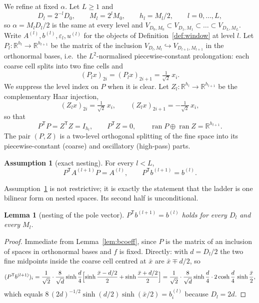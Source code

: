 \documentclass[11pt,a4paper]{article}
\theoremstyle{plain}
\newtheorem{lemma}[theorem]{Lemma}
\theoremstyle{definition}
\newtheorem{assumption}[theorem]{Assumption}
\newcommand{\R}{\mathbb{R}}
\newcommand{\T}{\mathsf{T}}
\newcommand{\ran}{\operatorname{ran}}
\begin{document}
We refine at fixed $\alpha$. Let $L\ge1$ and
\begin{equation}
\label{eq:levels}
  D_{l}=2^{-l}D_{0},\qquad M_{l}=2^{l}M_{0},\qquad h_{l}=M_{l}/2,
  \qquad l=0,\dots,L,
\end{equation}
so $\alpha=M_{l}D_{l}/2$ is the same at every level and
$V_{D_{0},M_{0}}\subset V_{D_{1},M_{1}}\subset\dots\subset V_{D_{L},M_{L}}$. Write
$A^{(l)},b^{(l)},\varepsilon_{l},u^{(l)}$ for the objects of
Definition~\ref{def:window} at level $l$. Let $P_{l}:\R^{h_{l}}\to\R^{h_{l+1}}$ be
the matrix of the inclusion $V_{D_{l},M_{l}}\hookrightarrow V_{D_{l+1},M_{l+1}}$ in
the orthonormal bases, i.e.\ the $L^{2}$-normalised piecewise-constant prolongation:
each coarse cell splits into two fine cells and
\begin{equation}
\label{eq:P}
  (P_{l}x)_{2i}=(P_{l}x)_{2i+1}=\tfrac{1}{\sqrt2}\,x_{i}.
\end{equation}
We suppress the level index on $P$ when it is clear. Let
$Z_{l}:\R^{h_{l}}\to\R^{h_{l+1}}$ be the complementary Haar injection,
\begin{equation}
\label{eq:Z}
  (Z_{l}x)_{2i}=\tfrac{1}{\sqrt2}\,x_{i},\qquad
  (Z_{l}x)_{2i+1}=-\tfrac{1}{\sqrt2}\,x_{i},
\end{equation}
so that
\begin{equation}
\label{eq:isometries}
  P^{\T}P=Z^{\T}Z=I_{h_{l}},\qquad P^{\T}Z=0,\qquad
  \ran P\oplus\ran Z=\R^{h_{l+1}} .
\end{equation}
The pair $(P,Z)$ is a two-level orthogonal splitting of the fine space into its
piecewise-constant (coarse) and oscillatory (high-pass) parts.

\begin{assumption}[exact nesting]
\label{ass:nesting}
For every $l<L$,
\begin{equation}
\label{eq:nesting}
  P^{\T}A^{(l+1)}P=A^{(l)},
  \qquad
  P^{\T}b^{(l+1)}=b^{(l)} .
\end{equation}
\end{assumption}

Assumption~\ref{ass:nesting} is not restrictive; it is exactly the statement that the
ladder is one bilinear form on nested spaces. Its second half is unconditional.

\begin{lemma}[nesting of the pole vector]
\label{lem:bnesting}
$P^{\T}b^{(l+1)}=b^{(l)}$ holds for every $D_{l}$ and every $M_{l}$.
\end{lemma}

\begin{proof}
Immediate from Lemma~\ref{lem:bcoeff}, since $P$ is the matrix of an inclusion of
spaces in orthonormal bases and $f$ is fixed. Directly: with $d=D_{l}/2$ the two fine
midpoints inside the coarse cell centred at $\bar x$ are $\bar x\mp d/2$, so
\[
  (P^{\T}b^{(l+1)})_{i}
  =\frac{1}{\sqrt2}\cdot\frac{8}{\sqrt d}\sinh\frac d4
   \Bigl[\sinh\frac{\bar x-d/2}{2}+\sinh\frac{\bar x+d/2}{2}\Bigr]
  =\frac{1}{\sqrt2}\cdot\frac{8}{\sqrt d}\sinh\frac d4\cdot
   2\cosh\frac d4\,\sinh\frac{\bar x}{2},
\]
which equals $8\,(2d)^{-1/2}\sinh(d/2)\sinh(\bar x/2)=b^{(l)}_{i}$ because
$D_{l}=2d$.
\end{proof}
\end{document}
